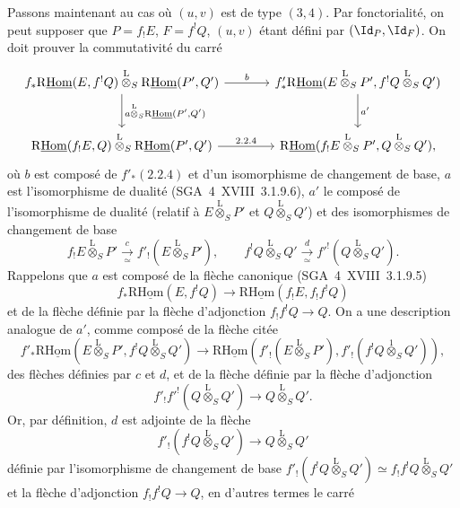 Passons maintenant au cas où $(u,v)$ est de type $(3,4)$. Par fonctorialité, on peut supposer que $P=f_{!}E$, $F=f^{!}Q$, $(u,v)$ étant défini par $(\Id_P,\Id_F)$. On doit prouver la commutativité du carré
\[
\begin{tikzcd}[
column sep=large,row sep=large]
f_*\mathrm{R}\underline{\mathrm{Hom}}(E,f^!Q)\overset{\mathrm{L}}{\otimes}_S\mathrm{R}\underline{\mathrm{Hom}}(P',Q') \arrow[r,"b"] \arrow[d,"{a\overset{\mathrm{L}}{\otimes}_S\mathrm{R}\underline{\mathrm{Hom}}(P',Q')}"] & f'_*\mathrm{R}\underline{\mathrm{Hom}}(E\overset{\mathrm{L}}{\otimes}_SP',f^!Q\overset{\mathrm{L}}{\otimes}_SQ') \arrow[d,"a'"]\\
\mathrm{R}\underline{\mathrm{Hom}}(f_!E,Q)\overset{\mathrm{L}}{\otimes}_S\mathrm{R}\underline{\mathrm{Hom}}(P',Q') \arrow[r,"2.2.4"] & \mathrm{R}\underline{\mathrm{Hom}}(f_!E\overset{\mathrm{L}}{\otimes}_SP',Q\overset{\mathrm{L}}{\otimes}_SQ'),
\end{tikzcd}
\]
où $b$ est composé de $f'_*(2.2.4)$ et d'un isomorphisme de changement de base, $a$ est l'isomorphisme de dualité (SGA~4~XVIII~3.1.9.6), $a'$ le composé de l'isomorphisme de dualité (relatif à $E\overset{\mathrm{L}}{\otimes}_SP'$ et $Q\overset{\mathrm{L}}{\otimes}_SQ'$) et des isomorphismes de changement de base
\[
f_!E\overset{\mathrm{L}}{\otimes}_SP'\xrightarrow[\simeq]{c}f'_!(E\overset{\mathrm{L}}{\otimes}_SP'),
\qquad
f^!Q\overset{\mathrm{L}}{\otimes}_SQ'\xrightarrow[\simeq]{d}f'^!(Q\overset{\mathrm{L}}{\otimes}_SQ').
\]
Rappelons que $a$ est composé de la flèche canonique (SGA~4~XVIII~3.1.9.5)
\[
f_*\mathrm{R}\underline{\mathrm{Hom}}(E,f^!Q)\longrightarrow\mathrm{R}\underline{\mathrm{Hom}}(f_!E,f_!f^!Q)
\]
et de la flèche définie par la flèche d'adjonction $f_!f^!Q\to Q$. On a une description analogue de $a'$, comme composé de la flèche citée
\begin{equation}\tag{*}
f'_*\mathrm{R}\underline{\mathrm{Hom}}(E\overset{\mathrm{L}}{\otimes}_SP',f^!Q\overset{\mathrm{L}}{\otimes}_SQ')\longrightarrow
\mathrm{R}\underline{\mathrm{Hom}}(f'_!(E\overset{\mathrm{L}}{\otimes}_SP'),f'_!(f^!Q\overset{1}{\otimes}_SQ')),
\end{equation}
des flèches définies par $c$ et $d$, et de la flèche définie par la flèche d'adjonction
\[
f'_!f'^!(Q\overset{\mathrm{L}}{\otimes}_SQ')\longrightarrow Q\overset{\mathrm{L}}{\otimes}_SQ'.
\]
Or, par définition, $d$ est adjointe de la flèche
\[
f'_!(f^!Q\overset{\mathrm{L}}{\otimes}_SQ')\longrightarrow Q\overset{\mathrm{L}}{\otimes}_SQ'
\]
définie par l'isomorphisme de changement de base $f'_!(f^!Q\overset{\mathrm{L}}{\otimes}_SQ')\simeq f_!f^!Q\overset{\mathrm{L}}{\otimes}_SQ'$ et la flèche d'adjonction $f_!f^!Q\to Q$, en d'autres termes le carré
